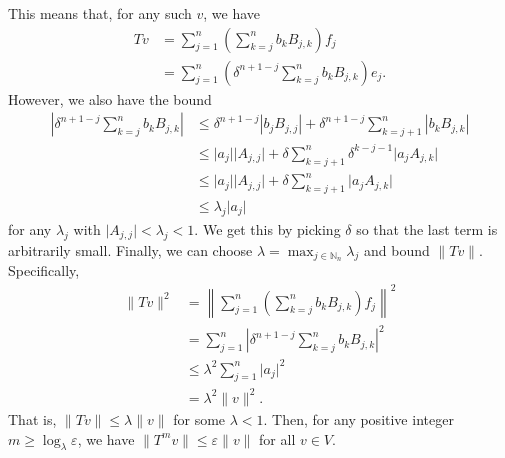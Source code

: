 \documentclass[12pt, letterpaper]{hmcpset}
\begin{document}
\begin{solution}
	This means that, for any such $v$, we have
	\[
		\begin{split}
			Tv & = \sum_{j = 1}^{n} \left ( \sum_{k = j}^{n} b_{k} B_{j, k} \right ) f_{j} \\
			   & = \sum_{j = 1}^{n} \left ( \delta^{n + 1 - j} \sum_{k = j}^{n} b_{k} B_{j, k} \right ) e_{j}.
		\end{split}
	\]
	However, we also have the bound
	\[
		\begin{split}
			\left \lvert \delta^{n + 1 - j} \sum_{k = j}^{n} b_{k} B_{j, k} \right \rvert & \le \delta^{n + 1 - j} \left \lvert b_{j} B_{j, j} \right \rvert + \delta^{n + 1 - j} \sum_{k = j + 1}^{n} \left \lvert b_{k} B_{j, k} \right \rvert \\
										   & \le \lvert a_{j} \rvert \lvert A_{j, j} \rvert + \delta \sum_{k = j + 1}^{n} \delta^{k - j - 1} \lvert a_{j} A_{j, k} \rvert \\
										   & \le \lvert a_{j} \rvert \lvert A_{j, j} \rvert + \delta \sum_{k = j + 1}^{n} \lvert a_{j} A_{j, k} \rvert \\
										   & \le \lambda_{j} \lvert a_{j} \rvert
		\end{split}
	\]
	for any $\lambda_{j}$ with $\lvert A_{j, j} \rvert < \lambda_{j} < 1$. We get this by picking $\delta$ so that the last term is arbitrarily small. Finally, we can choose $\lambda = \max_{j \in \mathbb{N}_{n}} \lambda_{j}$ and bound $\lVert Tv \rVert$. Specifically, 
	\[
		\begin{split}
			\lVert Tv \rVert^{2} & = \left \lVert \sum_{j = 1}^{n} \left ( \sum_{k = j}^{n} b_{k} B_{j, k} \right ) f_{j} \right \rVert^{2} \\
					 & = \sum_{j = 1}^{n} \left \lvert \delta^{n + 1 - j} \sum_{k = j}^{n} b_{k} B_{j, k} \right \rvert^{2} \\
					 & \le \lambda^{2} \sum_{j = 1}^{n} \lvert a_{j} \rvert^{2} \\
					 & = \lambda^{2} \lVert v \rVert^{2}.
		\end{split}
	\]
	That is, $\lVert Tv \rVert \le \lambda \lVert v \rVert$ for some $\lambda < 1$. Then, for any positive integer $m \ge \log_{\lambda} \varepsilon$, we have $\lVert T^{m} v \rVert \le \varepsilon \lVert v \rVert$ for all $v \in V$.
\end{solution}

\pagebreak
\end{document}
